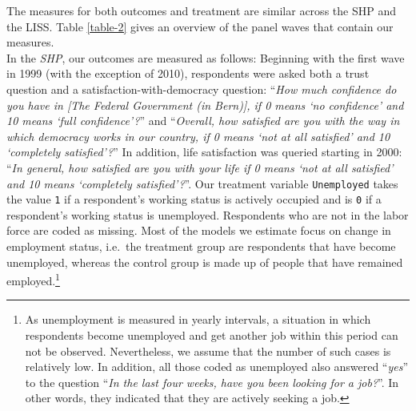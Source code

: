 \documentclass[12pt,]{article}
\let\rmarkdownfootnote\footnote%
\def\footnote{\protect\rmarkdownfootnote}
\begin{document}




The measures for both outcomes and treatment are similar across the SHP and the LISS. Table \ref{table-2} gives an overview of the panel waves that contain our measures.\\
In the \emph{SHP}, our outcomes are measured as follows: Beginning with the first wave in 1999 (with the exception of 2010), respondents were asked both a trust question and a satisfaction-with-democracy question: ``\emph{How much confidence do you have in {[}The Federal Government (in Bern){]}, if 0 means `no confidence' and 10 means `full confidence'?}'' and ``\emph{Overall, how satisfied are you with the way in which democracy works in our country, if 0 means `not at all satisfied' and 10 `completely satisfied'?}'' In addition, life satisfaction was queried starting in 2000: ``\emph{In general, how satisfied are you with your life if 0 means `not at all satisfied' and 10 means `completely satisfied'?}''. Our treatment variable \texttt{Unemployed} takes the value \texttt{1} if a respondent's working status is actively occupied and is \texttt{0} if a respondent's working status is unemployed. Respondents who are not in the labor force are coded as missing. Most of the models we estimate focus on change in employment status, i.e.~the treatment group are respondents that have become unemployed, whereas the control group is made up of people that have remained employed.\footnote{As unemployment is measured in yearly intervals, a situation in which respondents become unemployed and get another job within this period can not be observed. Nevertheless, we assume that the number of such cases is relatively low. In addition, all those coded as unemployed also answered ``\emph{yes}'' to the question ``\emph{In the last four weeks, have you been looking for a job?}''. In other words, they indicated that they are actively seeking a job.}\\
\end{document}

